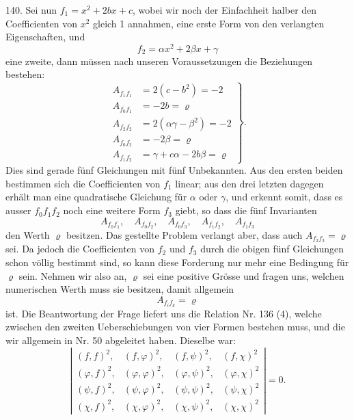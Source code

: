 \documentclass[11pt]{article}
\providecommand{\weq}[2]{\begin{equation}\tag{#1}#2\end{equation}}
\begin{document}
140. Sei nun $f_1 = x^2 + 2bx + c$, wobei wir noch der Einfachheit
 halber den Coefficienten von $x^2$ gleich 1 annahmen, eine erste
Form von den verlangten Eigenschaften, und
\[
f_2 = \alpha x^2 + 2\beta x + \gamma
\]
eine zweite, dann müssen nach unseren Voraussetzungen die Beziehungen
 bestehen:
\weq{I}{
\left.\begin{aligned}
A_{f_1f_1} &= 2(c - b^2) = -2 \\
A_{f_0f_1} &= -2b = \varrho \\
A_{f_2f_2} &= 2(\alpha\gamma - \beta^2) = -2 \\
A_{f_0f_2} &= -2\beta = \varrho \\
A_{f_1f_2} &= \gamma + c\alpha - 2b\beta = \varrho
\end{aligned}\right\} .
}
Dies sind gerade fünf Gleichungen mit fünf Unbekannten. Aus den
ersten beiden bestimmen sich die Coefficienten von $f_1$ linear; aus den
drei letzten dagegen erhält man eine quadratische Gleichung für $\alpha$
oder $\gamma$, und erkennt somit, dass es ausser $f_0 f_1 f_2$ noch eine weitere
Form $f_3$ giebt, so dass die fünf Invarianten
\[
A_{f_0f_1}, \quad A_{f_0f_2}, \quad A_{f_0f_3}, \quad A_{f_1f_2}, \quad A_{f_1f_3}
\]
den Werth $\varrho$ besitzen. Das gestellte Problem verlangt aber, dass
auch $A_{f_2f_3} = \varrho$ sei. Da jedoch die Coefficienten von $f_2$ und $f_3$ durch
die obigen fünf Gleichungen schon völlig bestimmt sind, so kann
diese Forderung nur mehr eine Bedingung für $\varrho$ sein. Nehmen wir
also an, $\varrho$ sei eine positive Grösse und fragen uns, welchen numerischen
 Werth muss sie besitzen, damit allgemein
\[
A_{f_if_k} = \varrho
\]
ist. Die Beantwortung der Frage liefert uns die Relation Nr. 136 (4),
welche zwischen den zweiten Ueberschiebungen von vier Formen bestehen
 muss, und die wir allgemein in Nr. 50 abgeleitet haben. Dieselbe
 war:
\[
\left|\begin{array}{cccc}
(f,f)^2, & (f,\varphi)^2, & (f,\psi)^2, & (f,\chi)^2 \\
(\varphi,f)^2, & (\varphi,\varphi)^2, & (\varphi,\psi)^2, & (\varphi,\chi)^2 \\
(\psi,f)^2, & (\psi,\varphi)^2, & (\psi,\psi)^2, & (\psi,\chi)^2 \\
(\chi,f)^2, & (\chi,\varphi)^2, & (\chi,\psi)^2, & (\chi,\chi)^2
\end{array}\right| = 0.
\]
\end{document}
